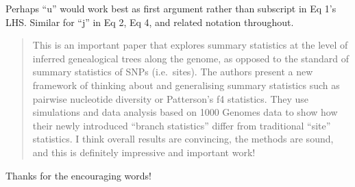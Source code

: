 
\begin{point}{}
    Perhaps ``u'' would work best as first argument rather than subscript in Eq 1's LHS. Similar for ``j'' in Eq 2, Eq 4, and related notation throughout.
\end{point}






\begin{quote}
This is an important paper that explores summary statistics at the level of inferred genealogical trees along the genome, as opposed to the standard of summary statistics of SNPs (i.e.\ sites).
The authors present a new framework of thinking about and generalising summary statistics such as pairwise nucleotide diversity or Patterson's f4 statistics.
They use simulations and data analysis based on 1000 Genomes data to show how their newly introduced ``branch statistics'' differ from traditional ``site'' statistics.
I think overall results are convincing, the methods are sound, and this is definitely impressive and important work!
\end{quote}

Thanks for the encouraging words!

